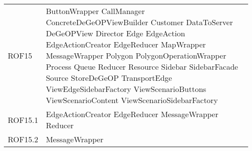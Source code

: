 \begin{longtable}{p{2.5cm}!{\VRule[1pt]}p{5cm}}
		ROF15 & ButtonWrapper \newline CallManager \newline ConcreteDeGeOPViewBuilder \newline Customer \newline DataToServer \newline DeGeOPView \newline Director \newline Edge \newline EdgeAction \newline EdgeActionCreator \newline EdgeReducer \newline MapWrapper \newline MessageWrapper \newline Polygon \newline PolygonOperationWrapper \newline Process \newline Queue \newline Reducer \newline Resource \newline Sidebar \newline SidebarFacade \newline Source \newline StoreDeGeOP \newline TransportEdge \newline ViewEdgeSidebarFactory \newline ViewScenarioButtons \newline ViewScenarioContent \newline ViewScenarioSidebarFactory\\
		ROF15.1 & EdgeActionCreator \newline EdgeReducer \newline MessageWrapper \newline Reducer\\
		ROF15.2 & MessageWrapper\\

\end{longtable}
